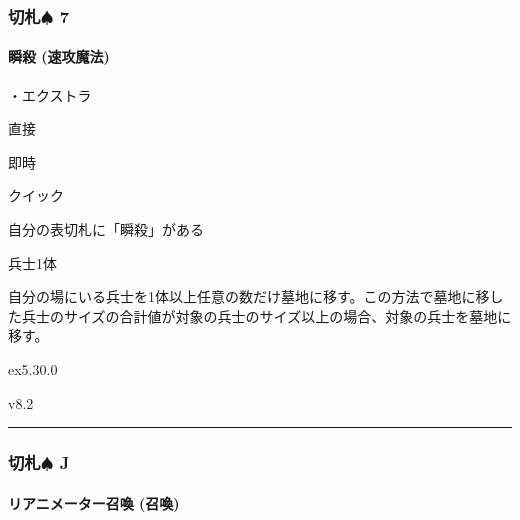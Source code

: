 \documentclass[letterpaper,10pt,dvipdfmx]{sphinxmanual}
\begin{document}
\subsubsection{切札{\normalsize $\spadesuit$} 7}
\label{\detokenize{auto/frameActionlist:id24}}

\paragraph{瞬殺 (速攻魔法)}
\label{\detokenize{auto/frameActionlist:act-instantkill}}\label{\detokenize{auto/frameActionlist:id25}}
\sphinxAtStartPar
{}

\sphinxAtStartPar
・エクストラ

\sphinxAtStartPar
{} 直接

\sphinxAtStartPar
{} 即時

\sphinxAtStartPar
{} クイック

\sphinxAtStartPar
{}

\sphinxAtStartPar
自分の表切札に「瞬殺」がある

\sphinxAtStartPar
{}

\sphinxAtStartPar
兵士1体

\sphinxAtStartPar
{}

\sphinxAtStartPar
自分の場にいる兵士を1体以上任意の数だけ墓地に移す。この方法で墓地に移した兵士のサイズの合計値が対象の兵士のサイズ以上の場合、対象の兵士を墓地に移す。

\sphinxAtStartPar
{}  ex5.30.0

\sphinxAtStartPar
{}  v8.2


\bigskip\hrule\bigskip



\subsubsection{切札{\normalsize $\spadesuit$} J}
\label{\detokenize{auto/frameActionlist:j}}

\paragraph{リアニメーター召喚 (召喚)}
\label{\detokenize{auto/frameActionlist:act-summonreanimator}}\label{\detokenize{auto/frameActionlist:id26}}
\sphinxAtStartPar
{}
\end{document}
